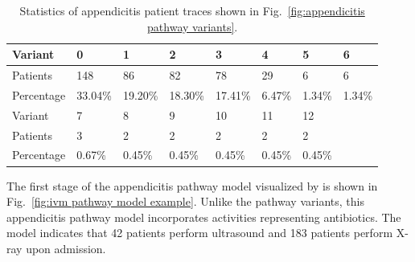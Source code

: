 \begin{table}[t]
\centering
\caption{Statistics of appendicitis patient traces shown in Fig.~\ref{fig:appendicitis pathway variants}.}
\label{table:appendicitis variant table}
\begin{tabular}{llllllll}
  \hline
  \hline
Variant &     0  &     1  &     2  &     3  &    4  &    5  &    6  \\
\hline
Patients   &    148 &     86 &     82 &     78 &    29 &     6 &     6 \\
  Percentage &  33.04\% &  19.20\% &  18.30\% &  17.41\% &  6.47\% &  1.34\% &  1.34\%\\
  \hline
  \hline
Variant &     7  &    8  &    9  &    10 &    11 &    12 \\
\hline
Patients   &   3 &     2 &     2 &     2 &     2 &     2 \\
Percentage &  0.67\% &  0.45\% &  0.45\% &  0.45\% &  0.45\% &  0.45\% \\
  \hline
  \hline
\end{tabular}
\end{table}

The first stage of the appendicitis pathway model visualized by  is shown in Fig.~\ref{fig:ivm pathway model example}.
Unlike the pathway variants, this appendicitis pathway model incorporates activities representing antibiotics. The model indicates that 42 patients perform ultrasound and 183 patients perform X-ray upon admission. 

